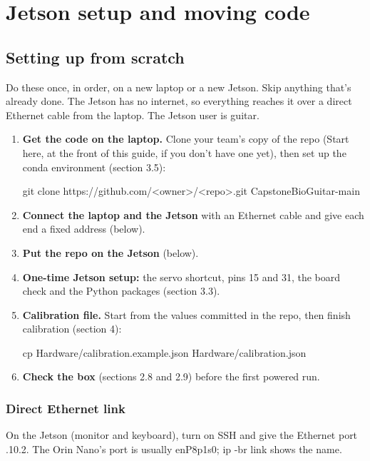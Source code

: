 \documentclass[11pt,letterpaper]{article}
\newcommand{\code}[1]{\textcolor{codeblue}{\ttfamily\smaller\relax #1}}
\begin{document}
\section{Jetson setup and moving code}

\subsection{Setting up from scratch}
Do these once, in order, on a new laptop or a new Jetson. Skip anything that's already done. The Jetson has no internet, so everything reaches it over a direct Ethernet cable from the laptop. The Jetson user is \code{guitar}.

\begin{enumerate}
  \item \textbf{Get the code on the laptop.} Clone your team's copy of the repo (Start here, at the front of this guide, if you don't have one yet), then set up the conda environment (section 3.5):
\begin{codeblock}
git clone https://github.com/<owner>/<repo>.git CapstoneBioGuitar-main
\end{codeblock}
  \item \textbf{Connect the laptop and the Jetson} with an Ethernet cable and give each end a fixed address (below).
  \item \textbf{Put the repo on the Jetson} (below).
  \item \textbf{One-time Jetson setup:} the \code{servo} shortcut, pins 15 and 31, the board check and the Python packages (section 3.3).
  \item \textbf{Calibration file.} Start from the values committed in the repo, then finish calibration (section 4):
\begin{codeblock}
cp Hardware/calibration.example.json Hardware/calibration.json
\end{codeblock}
  \item \textbf{Check the box} (sections 2.8 and 2.9) before the first powered run.
\end{enumerate}

\subsubsection*{Direct Ethernet link}
On the Jetson (monitor and keyboard), turn on SSH and give the Ethernet port \code{192.168.10.2}. The Orin Nano's port is usually \code{enP8p1s0}; \code{ip -{}br link} shows the name.
\end{document}
